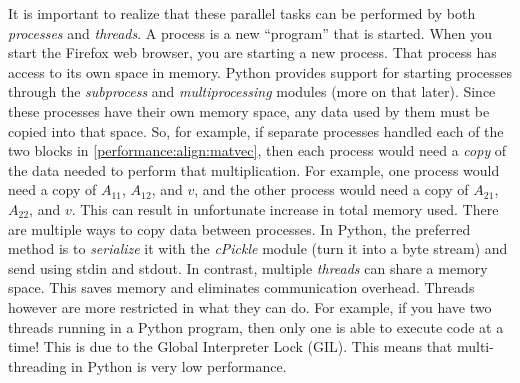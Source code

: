 It is important to realize that these parallel tasks can be performed by both \emph{processes} and \emph{threads}.  A process is a new ``program'' that is started.  When you start the Firefox web browser, you are starting a new process.  That process has access to its own space in memory.  Python provides support for starting processes through the \emph{subprocess} and \emph{multiprocessing} modules (more on that later).  Since these processes have their own memory space, any data used by them must be copied into that space.  So, for example, if separate processes handled each of the two blocks in \eqref{performance:align:matvec}, then each process would need a \emph{copy} of the data needed to perform that multiplication.  For example, one process would need a copy of $A_{11}$, $A_{12}$, and $v$, and the other process would need a copy of $A_{21}$, $A_{22}$, and $v$.  This can result in unfortunate increase in total memory used.  There are multiple ways to copy data between processes.  In Python, the preferred method is to \emph{serialize} it with the \emph{cPickle} module (turn it into a byte stream) and send using stdin and stdout.  In contrast, multiple \emph{threads} can share a memory space.  This saves memory and eliminates communication overhead.  Threads however are more restricted in what they can do.  For example, if you have two threads running in a Python program, then only one is able to execute code at a time!  This is due to the Global Interpreter Lock (GIL).  This means that multi-threading in Python is very low performance.  

